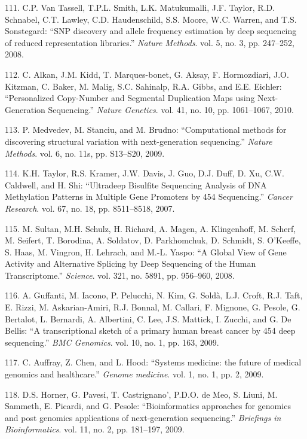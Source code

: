 \documentclass[12pt,twoside]{ugathesis}
\theoremstyle{definition}
\theoremstyle{definition}
\theoremstyle{remark}
\begin{document}
\hypertarget{ref-VanTassell2008}{}
111. C.P. Van Tassell, T.P.L. Smith, L.K. Matukumalli, J.F. Taylor, R.D.
Schnabel, C.T. Lawley, C.D. Haudenschild, S.S. Moore, W.C. Warren, and
T.S. Sonstegard: ``SNP discovery and allele frequency estimation by deep
sequencing of reduced representation libraries.'' \emph{Nature Methods}.
vol. 5, no. 3, pp. 247--252, 2008.

\hypertarget{ref-Alkan2010}{}
112. C. Alkan, J.M. Kidd, T. Marques-bonet, G. Aksay, F. Hormozdiari,
J.O. Kitzman, C. Baker, M. Malig, S.C. Sahinalp, R.A. Gibbs, and E.E.
Eichler: ``Personalized Copy-Number and Segmental Duplication Maps using
Next-Generation Sequencing.'' \emph{Nature Genetics}. vol. 41, no. 10,
pp. 1061--1067, 2010.

\hypertarget{ref-Medvedev2009}{}
113. P. Medvedev, M. Stanciu, and M. Brudno: ``Computational methods for
discovering structural variation with next-generation sequencing.''
\emph{Nature Methods}. vol. 6, no. 11s, pp. S13--S20, 2009.

\hypertarget{ref-Taylor2007}{}
114. K.H. Taylor, R.S. Kramer, J.W. Davis, J. Guo, D.J. Duff, D. Xu,
C.W. Caldwell, and H. Shi: ``Ultradeep Bisulfite Sequencing Analysis of
DNA Methylation Patterns in Multiple Gene Promoters by 454 Sequencing.''
\emph{Cancer Research}. vol. 67, no. 18, pp. 8511--8518, 2007.

\hypertarget{ref-Sultan2008}{}
115. M. Sultan, M.H. Schulz, H. Richard, A. Magen, A. Klingenhoff, M.
Scherf, M. Seifert, T. Borodina, A. Soldatov, D. Parkhomchuk, D.
Schmidt, S. O'Keeffe, S. Haas, M. Vingron, H. Lehrach, and M.-L. Yaspo:
``A Global View of Gene Activity and Alternative Splicing by Deep
Sequencing of the Human Transcriptome.'' \emph{Science}. vol. 321, no.
5891, pp. 956--960, 2008.

\hypertarget{ref-Guffanti2009}{}
116. A. Guffanti, M. Iacono, P. Pelucchi, N. Kim, G. Soldà, L.J. Croft,
R.J. Taft, E. Rizzi, M. Askarian-Amiri, R.J. Bonnal, M. Callari, F.
Mignone, G. Pesole, G. Bertalot, L. Bernardi, A. Albertini, C. Lee, J.S.
Mattick, I. Zucchi, and G. De Bellis: ``A transcriptional sketch of a
primary human breast cancer by 454 deep sequencing.'' \emph{BMC
Genomics}. vol. 10, no. 1, pp. 163, 2009.

\hypertarget{ref-Auffray2009}{}
117. C. Auffray, Z. Chen, and L. Hood: ``Systems medicine: the future of
medical genomics and healthcare.'' \emph{Genome medicine}. vol. 1, no.
1, pp. 2, 2009.

\hypertarget{ref-Horner2009}{}
118. D.S. Horner, G. Pavesi, T. Castrignano', P.D.O. de Meo, S. Liuni,
M. Sammeth, E. Picardi, and G. Pesole: ``Bioinformatics approaches for
genomics and post genomics applications of next-generation sequencing.''
\emph{Briefings in Bioinformatics}. vol. 11, no. 2, pp. 181--197, 2009.
\end{document}
